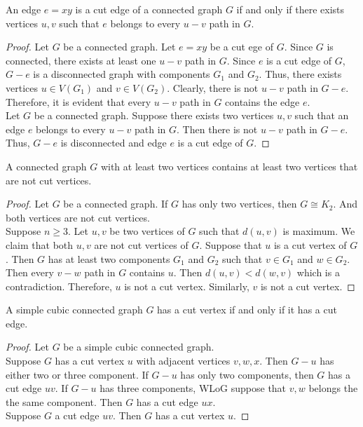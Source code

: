 \begin{theorem}
	An edge $e = xy$ is a cut edge of a connected graph $G$ if and only if there exists vertices $u,v$ such that $e$ belongs to every $u-v$ path in $G$.
\end{theorem}
\begin{proof}
	Let $G$ be a connected graph. Let $e = xy$ be a cut ege of $G$. Since $G$ is connected, there exists at least one $u-v$ path in $G$. Since $e$ is a cut edge of $G$, $G-e$ is a disconnected graph with components $G_1$ and $G_2$. Thus, there exists vertices $u \in V(G_1)$ and $v \in V(G_2)$. Clearly, there is not $u-v$ path in $G-e$. Therefore, it is evident that every $u-v$ path in $G$ contains the edge $e$.\\

	Let $G$ be a connected graph. Suppose there exists two vertices $u,v$ such that an edge $e$ belongs to every $u-v$ path in $G$. Then there is not $u-v$ path in $G-e$. Thus, $G-e$ is disconnected and edge $e$ is a cut edge of $G$.
\end{proof}

\begin{theorem}
	A connected graph $G$ with at least two vertices contains at least two vertices that are not cut vertices.
\end{theorem}
\begin{proof}
	Let $G$ be a connected graph. If $G$ has only two vertices, then $G \cong K_2$. And both vertices are not cut vertices.\\

	Suppose $n \ge 3$. Let $u,v$ be two vertices of $G$ such that $d(u,v)$ is maximum. We claim that both $u,v$ are not cut vertices of $G$. Suppose that $u$ is a cut vertex of $G$. Then $G$ has at least two components $G_1$ and $G_2$ such that $v \in G_1$ and $w \in G_2$. Then every $v-w$ path in $G$ contains $u$. Then $d(u,v) < d(w,v)$ which is a contradiction. Therefore, $u$ is not a cut vertex. Similarly, $v$ is not a cut vertex.
\end{proof}

\begin{proposition}
	A simple cubic connected graph $G$ has a cut vertex if and only if it has a cut edge.
\end{proposition}
\begin{proof}
	Let $G$ be a simple cubic connected graph.\\

	Suppose $G$ has a cut vertex $u$ with adjacent vertices $v,w,x$. Then $G-u$ has either two or three component. If $G-u$ has only two components, then $G$ has a cut edge $uv$. If $G-u$ has three components, WLoG suppose that $v,w$ belongs the the same component. Then $G$ has a cut edge $ux$.\\

	Suppose $G$ a cut edge $uv$. Then $G$ has a cut vertex $u$.
\end{proof}

